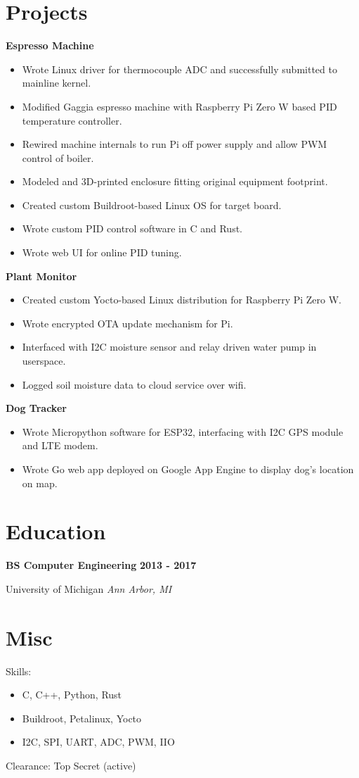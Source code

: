 \documentclass{article}
\newcommand{\experience}[4]{
    \noindent \textbf{#1} \hfill \textbf{#2} \par
    \noindent #3 \hfill \textit{#4} \par
}
\begin{document}
    \section*{Projects}
        \noindent \textbf{Espresso Machine}
        \begin{itemize}
            \item Wrote Linux driver for thermocouple ADC and successfully submitted to mainline kernel.
            \item Modified Gaggia espresso machine with Raspberry Pi Zero W based PID temperature controller.
            \item Rewired machine internals to run Pi off power supply and allow PWM control of boiler.
            \item Modeled and 3D-printed enclosure fitting original equipment footprint.
            \item Created custom Buildroot-based Linux OS for target board.
            \item Wrote custom PID control software in C and Rust.
            \item Wrote web UI for online PID tuning.
        \end{itemize}

        \noindent \textbf{Plant Monitor}
        \begin{itemize}
            \item Created custom Yocto-based Linux distribution for Raspberry Pi Zero W.
            \item Wrote encrypted OTA update mechanism for Pi.
            \item Interfaced with I2C moisture sensor and relay driven water pump in userspace.
            \item Logged soil moisture data to cloud service over wifi.
        \end{itemize}

        \noindent \textbf{Dog Tracker}
        \begin{itemize}
            \item Wrote Micropython software for ESP32, interfacing with I2C GPS module and LTE modem.
            \item Wrote Go web app deployed on Google App Engine to display dog's location on map.
        \end{itemize}

    \section*{Education}
        \experience{BS Computer Engineering}{2013 - 2017}{University of Michigan}{Ann Arbor, MI}

    \section*{Misc}
        \noindent Skills:
        \begin{itemize}
            \item C, C++, Python, Rust
            \item Buildroot, Petalinux, Yocto
            \item I2C, SPI, UART, ADC, PWM, IIO
        \end{itemize}
        \noindent Clearance: Top Secret (active) \par
\end{document}
